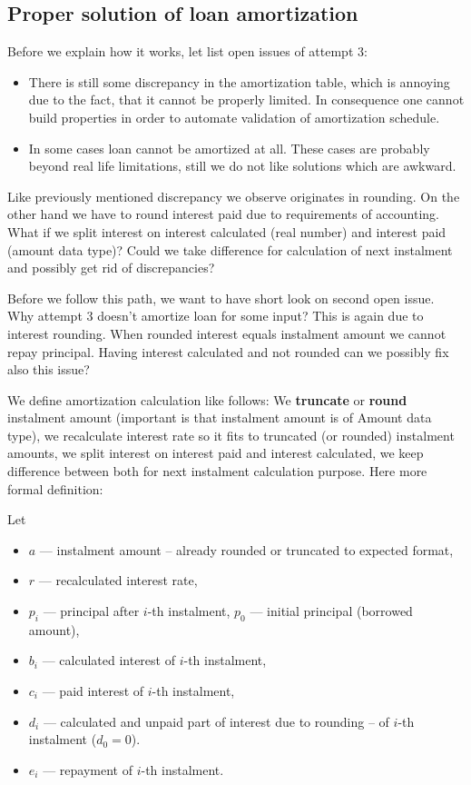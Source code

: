 \documentclass[letterpaper,11pt]{article}
\begin{document}
\subsection {Proper solution of loan amortization}
Before we explain how it works, let list open issues of attempt 3:
\begin {itemize}
\item There is still some discrepancy in the amortization table, which is annoying due to the fact, that it cannot be properly limited. In consequence one cannot build properties in order to automate validation of amortization schedule.
\item In some cases loan cannot be amortized at all. These cases are probably beyond real life limitations, still we do not like solutions which are awkward.
\end{itemize}

Like previously mentioned discrepancy we observe originates in rounding. On the other hand we have to round interest paid due to requirements of accounting. What if we split interest on interest calculated (real number) and interest paid (amount data type)? Could we take difference for calculation of next instalment and possibly get rid of discrepancies?

Before we follow this path, we want to have short look on second open issue. Why attempt 3 doesn't amortize loan for some input? This is again due to interest rounding. When rounded interest equals instalment amount we cannot repay principal. Having interest calculated and not rounded can we possibly fix also this issue?

We define amortization calculation like follows:
We {\bf truncate} or {\bf round} instalment amount (important is that instalment amount is of Amount data type),
we recalculate interest rate so it fits to truncated (or rounded) instalment amounts,
we split interest on interest paid and interest calculated,
we keep difference between both for next instalment calculation purpose. Here more formal definition:

Let
\begin {itemize}
\item $a$ --- instalment amount -- already rounded or truncated to expected format,
\item $r$ --- recalculated interest rate,
\item $p_i$ --- principal after $i$-th instalment, $p_0$ --- initial principal (borrowed amount),
\item $b_i$ --- calculated interest of $i$-th instalment,
\item $c_i$ --- paid interest of $i$-th instalment,
\item $d_i$ --- calculated and unpaid part of interest due to rounding -- of $i$-th instalment ($d_0 = 0$).
\item $e_i$ --- repayment of $i$-th instalment.
\end{itemize}
\end{document}
